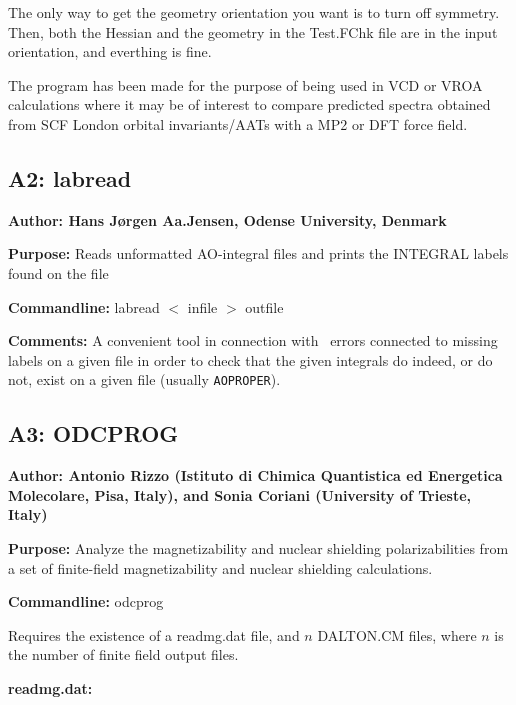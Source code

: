 The only way to get the geometry orientation you want is to turn
        off symmetry. 
        Then, both the Hessian and the geometry in the Test.FChk file are
        in the input orientation, and everthing is fine.

The program has been made for the purpose of being used in VCD or
VROA 
calculations where it may be of interest to compare predicted spectra
obtained from SCF London orbital invariants/AATs with a MP2 or DFT force field.

\subsection*{A2: labread}

\noindent
{\large\bf Author: \normalsize\large Hans J\o rgen Aa.Jensen,
Odense University, Denmark}

\smallskip

\noindent 
{\bf Purpose:} Reads unformatted AO-integral files and prints the
INTEGRAL labels found on the file

\smallskip
\noindent
{\bf Commandline:} labread $<$ infile $>$ outfile

\smallskip
\noindent
{\bf Comments:}  A convenient tool in connection with \siraba\ errors
connected to missing labels on a given file in order to check that the
given integrals do indeed, or do not, exist on a given file (usually
\verb|AOPROPER|). 

\subsection*{A3: ODCPROG}

\noindent
{\large\bf Author: \normalsize\large Antonio Rizzo (Istituto di
Chimica Quantistica ed Energetica Molecolare, Pisa, Italy), and
Sonia Coriani (University of Trieste, Italy)}

\smallskip

\noindent 
{\bf Purpose:} Analyze the magnetizability and nuclear shielding
polarizabilities from a set of finite-field magnetizability and
nuclear shielding calculations.

\smallskip
\noindent
{\bf Commandline:} odcprog

Requires the existence of a readmg.dat file, and $n$ DALTON.CM files,
where $n$ is the number of finite field output files.

\smallskip
\noindent
{\bf readmg.dat:} 

